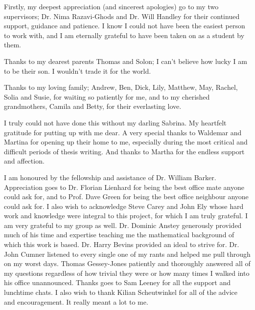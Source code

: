 
\begin{acknowledgements}      

Firstly, my deepest appreciation (and sincerest apologies) go to my two supervisors; Dr. Nima Razavi-Ghods and Dr. Will Handley for their continued support, guidance and patience. I know I could not have been the easiest person to work with, and I am eternally grateful to have been taken on as a student by them.

Thanks to my dearest parents Thomas and Solon; I can’t believe how lucky I am to be their son. I wouldn’t trade it for the world.

Thanks to my loving family; Andrew, Ben, Dick, Lily, Matthew, May, Rachel, Solia and Susie, for waiting so patiently for me, and to my cherished grandmothers, Camila and Betty, for their everlasting love.

I truly could not have done this without my darling Sabrina. My heartfelt gratitude for putting up with me dear. A very special thanks to Waldemar and Martina for opening up their home to me, especially during the most critical and difficult periods of thesis writing. And thanks to Martha for the endless support and affection.

I am honoured by the fellowship and assistance of Dr. William Barker. Appreciation goes to Dr. Florian Lienhard for being the best office mate anyone could ask for, and to Prof. Dave Green for being the best office neighbour anyone could ask for. I also wish to acknowledge Steve Carey and John Ely whose hard work and knowledge were integral to this project, for which I am truly grateful. I am very grateful to my group as well. Dr. Dominic Anstey generously provided much of his time and expertise teaching me the mathematical background of which this work is based. Dr. Harry Bevins provided an ideal to strive for. Dr. John Cumner listened to every single one of my rants and helped me pull through on my worst days. Thomas Gessey-Jones patiently and thoroughly answered all of my questions regardless of how trivial they were or how many times I walked into his office unannounced. Thanks goes to Sam Leeney for all the support and lunchtime chats. I also wish to thank Kilian Scheutwinkel for all of the advice and encouragement. It really meant a lot to me.


\end{acknowledgements}
